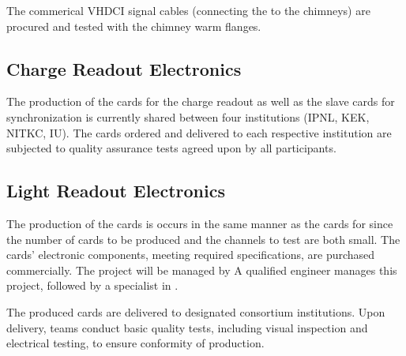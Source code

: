 The commerical VHDCI signal cables (connecting the  to the  chimneys) are procured and tested with the  chimney warm flanges.



\subsection{Charge Readout Electronics}
\label{sec:fddp-tpc-elec-prod-cro}
The production of the  cards for the charge readout as well as the  slave cards for synchronization is currently shared between four institutions (IPNL, KEK, NITKC, IU). The cards ordered and delivered to each respective institution are subjected to quality assurance tests agreed upon by all participants.  

\subsection{Light Readout Electronics}
\label{sec:fddp-tpc-elec-prod-lro}

The production of the   cards is %
occurs in the same manner as the cards for  since the number of cards to be produced and the channels to test are both small. The cards' electronic components, meeting required specifications, are purchased commercially. %
The project will be managed by 
A qualified engineer manages this project, followed by  a specialist in .

The produced cards are %
delivered to %
designated consortium institutions. %
Upon delivery, teams conduct basic quality tests, including visual inspection and electrical testing, to ensure conformity of production.

